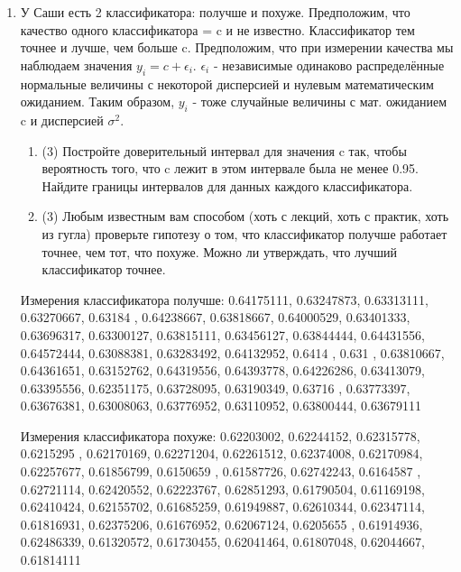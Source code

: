 \documentclass[a4paper, 14pt]{extarticle}
\begin{document}
\begin{enumerate}
\item У Саши есть 2 классификатора: получше и похуже. 
Предположим, что качество одного классификатора = c и не известно. 
Классификатор тем точнее и лучше, чем больше c. Предположим, что при измерении  
качества мы наблюдаем значения $y_i = c + \epsilon_i$. $\epsilon_i$ - 
независимые одинаково распределённые нормальные величины с некоторой 
дисперсией и нулевым математическим ожиданием. Таким образом, $y_i$
 - тоже случайные величины с мат. ожиданием c и дисперсией $\sigma^2$.
\begin{enumerate}
\item (3) Постройте доверительный интервал для значения c так, чтобы вероятность того, что c лежит в этом интервале была не менее 0.95. Найдите границы интервалов для данных каждого классификатора.

\item (3) Любым известным вам способом (хоть с лекций, хоть с практик, хоть из гугла) проверьте гипотезу о том, что классификатор получше работает точнее, чем тот, что похуже. Можно ли утверждать, что лучший классификатор точнее.
\end{enumerate}
Измерения классификатора получше:
0.64175111, 0.63247873, 0.63313111, 0.63270667, 0.63184   ,
0.64238667, 0.63818667, 0.64000529, 0.63401333, 0.63696317,
0.63300127, 0.63815111, 0.63456127, 0.63844444, 0.64431556,
0.64572444, 0.63088381, 0.63283492, 0.64132952, 0.6414    ,
0.631     , 0.63810667, 0.64361651, 0.63152762, 0.64319556,
0.64393778, 0.64226286, 0.63413079, 0.63395556, 0.62351175,
0.63728095, 0.63190349, 0.63716   , 0.63773397, 0.63676381,
0.63008063, 0.63776952, 0.63110952, 0.63800444, 0.63679111

Измерения классификатора похуже:
0.62203002, 0.62244152, 0.62315778, 0.6215295 , 0.62170169,
0.62271204, 0.62261512, 0.62374008, 0.62170984, 0.62257677,
0.61856799, 0.6150659 , 0.61587726, 0.62742243, 0.6164587 ,
0.62721114, 0.62420552, 0.62223767, 0.62851293, 0.61790504,
0.61169198, 0.62410424, 0.62155702, 0.61685259, 0.61949887,
0.62610344, 0.62347114, 0.61816931, 0.62375206, 0.61676952,
0.62067124, 0.6205655 , 0.61914936, 0.62486339, 0.61320572,
0.61730455, 0.62041464, 0.61807048, 0.62044667, 0.61814111

\end{enumerate}
\end{document}
